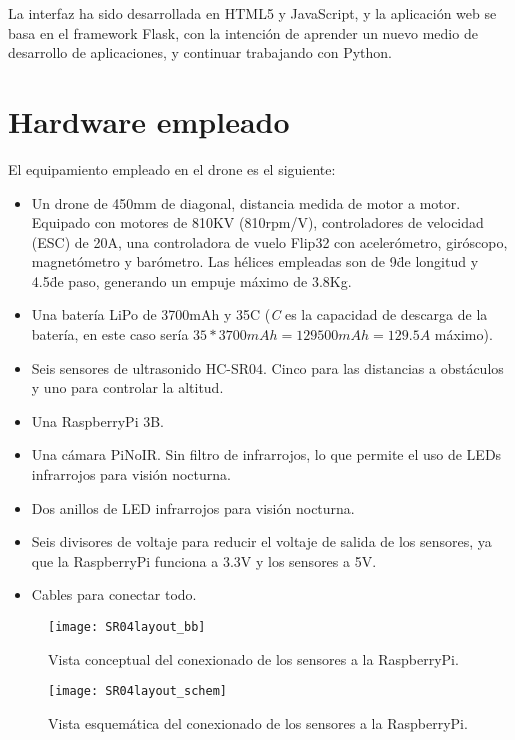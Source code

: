 La interfaz ha sido desarrollada en HTML5 y JavaScript, y la aplicación web se basa en el framework Flask, con la intención de aprender un nuevo medio de desarrollo de aplicaciones, y continuar trabajando con Python. 



\section{Hardware empleado}

El equipamiento empleado en el drone es el siguiente: 

\begin{itemize}
\item Un drone de 450mm de diagonal, distancia medida de motor a motor. Equipado con motores de 810KV (810rpm/V), controladores de velocidad (ESC) de 20A, una controladora de vuelo Flip32 con acelerómetro, giróscopo, magnetómetro y barómetro. Las hélices empleadas son de 9\" de longitud y 4.5\" de paso, generando un empuje máximo de 3.8Kg.
\item Una batería LiPo de 3700mAh y 35C (\emph{C} es la capacidad de descarga de la batería, en este caso sería $35 * 3700mAh = 129500mAh = 129.5A$ máximo).
\item Seis sensores de ultrasonido HC-SR04. Cinco para las distancias a obstáculos y uno para controlar la altitud.
\item Una RaspberryPi 3B.
\item Una cámara PiNoIR. Sin filtro de infrarrojos, lo que permite el uso de LEDs infrarrojos para visión nocturna.
\item Dos anillos de LED infrarrojos para visión nocturna.
\item Seis divisores de voltaje para reducir el voltaje de salida de los sensores, ya que la RaspberryPi funciona a 3.3V y los sensores a 5V.
\item Cables para conectar todo.
\end{itemize}

\begin{figure}[H]
	\centering
	\texttt{[image: SR04layout\_bb]}
	\caption[Conceptual de conexión de sensores a RaspberryPi]{Vista conceptual del conexionado de los sensores a la RaspberryPi.}\label{fig:schHCPi}
\end{figure}

\begin{figure}[H]
	\centering
	\texttt{[image: SR04layout\_schem]}
	\caption[Diagrama de conexión de sensores a RaspberryPi]{Vista esquemática del conexionado de los sensores a la RaspberryPi.}\label{fig:concepHCPi}
\end{figure}

